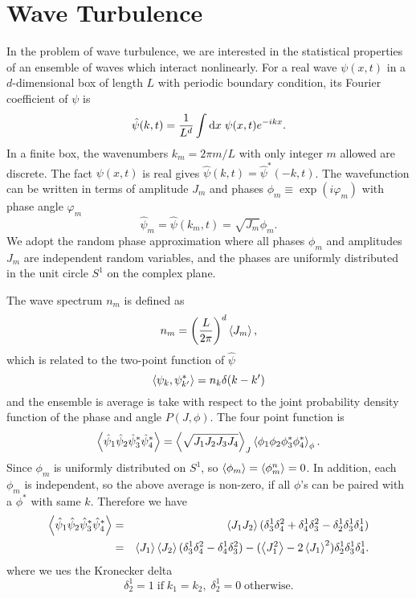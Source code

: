 \newcommand{\abs}[1]{\left|{ #1}\right |}

\chapter{Wave Turbulence}
\label{app:wave-turbulence}
In the problem of wave turbulence, we are interested in the statistical properties of an ensemble of waves which interact nonlinearly.
For a real wave $\psi(x,t)$ in a $d$-dimensional box of length $L$ with periodic boundary condition, its Fourier coefficient of $\psi$ is
\begin{equation}
	\hat{\psi}(k,t) = \frac{1}{L^d}\int \mathrm{d} x\; \psi(x,t)e^{-i k x}.
\end{equation}
In a finite box, the wavenumbers $k_m=2\pi m/L$ with only integer $m$ allowed are discrete. 
The fact $\psi(x,t)$ is real gives $\hat{\psi}(k,t) = \hat{\psi}^*(-k,t)$.
The wavefunction can be written in terms of amplitude $J_m$ and phases $\phi_m \equiv \exp(i\varphi_m)$ with phase angle $\varphi_m$
%
\begin{equation}
	\hat{\psi}_m = \hat{\psi}(k_m,t) = \sqrt{J_m} {\phi_m}.
\end{equation}
%
We adopt the random phase approximation where all phases $\phi_m$ and amplitudes $J_m$ are independent random variables, and the phases are uniformly distributed in the unit circle $S^1$ on the complex plane.

The wave spectrum $n_m$ is defined as 
\begin{equation}
	n_m = \left(\frac{L}{2\pi}\right)^d\left< J_m\right>,
\end{equation}
which is related to the two-point function of $\hat{\psi}$
\begin{equation}
	\left< \psi_k,\psi^*_{k'}\right> = n_k\delta(k-k')
\end{equation}
and the ensemble is average is take with respect to the joint probability density function of the phase and angle $P(J,\phi)$.
The four point function is
\begin{equation}
	\left< \hat{\psi}_1\hat{\psi}_2\hat{\psi}^*_3\hat{\psi}^*_4\right> = \left< \sqrt{J_1 J_2 J_3 J_4}\right>_J\left< \phi_1\phi_2\phi^*_3\phi^*_4\right>_\phi.
\end{equation}
Since $\phi_m$ is uniformly distributed on $S^1$, so $\left< \phi_m\right>=\left< \phi^n_m\right>=0$. 
In addition, each $\phi_m$ is independent, so the above average is non-zero, if all $\phi$'s can be paired with a $\phi^*$ with same $k$. 
Therefore we have
\begin{eqnarray}
	\left< \hat{\psi}_1\hat{\psi}_2\hat{\psi}^*_3\hat{\psi}^*_4\right> &=& \left< J_1 J_2\right>(\delta_3^1\delta_4^2+\delta_4^1\delta_3^2-\delta_2^1\delta_3^1\delta_4^1)\nonumber\\
	&=&	\left< J_1\right>\left< J_2\right>(\delta_3^1\delta_4^2-\delta_4^1\delta_3^2)-(\left< J_1^2\right>-2\left< J_1\right>^2)\delta_2^1\delta_3^1\delta_4^1.
\end{eqnarray}
where we ues the Kronecker delta
\begin{equation}
	\delta_2^1 = 1\; \mathrm{if}\; k_1=k_2,\; \delta_2^1 = 0\;\mathrm{otherwise}.
\end{equation}

